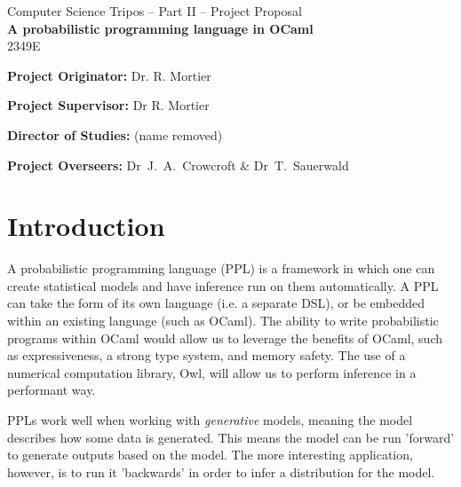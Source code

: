\vfil


\begin{center}
	{\Large Computer Science Tripos -- Part II -- Project Proposal} \\
	\vspace{0.4in}
	{\huge \bf A probabilistic programming language in OCaml } \\
	\vspace{0.4in}
	{\large 2349E}
	\vspace{0.1in}
			
\end{center}
\vspace{0.4in}


\vfil

\textbf{Project Originator:} Dr. R. Mortier
\vspace{0.1in}

\textbf{Project Supervisor:} Dr R. Mortier
\vspace{0.1in}

\textbf{Director of Studies:} (name removed)
\vspace{0.1in}

\textbf{Project Overseers:} Dr~J.~A.~Crowcroft  \& Dr~T.~Sauerwald

\vfil
\clearpage

\section*{Introduction}

A probabilistic programming language (PPL) is a framework in which one can create statistical models and have inference run on them automatically. A PPL can take the form of its own language (i.e. a separate DSL), or be embedded within an existing language (such as OCaml). The ability to write probabilistic programs within OCaml would allow us to leverage the benefits of OCaml, such as expressiveness, a strong type system, and memory safety. The use of a numerical computation library, Owl, will allow us to perform inference in a performant way.

PPLs work well when working with \textit{generative} models, meaning the model describes how some data is generated. This means the model can be run 'forward' to generate outputs based on the model. The more interesting application, however, is to run it 'backwards' in order to infer a distribution for the model.

